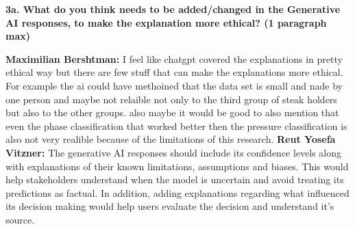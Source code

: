 \documentclass[10pt,twocolumn]{article}
\begin{document}
\smallskip
\noindent\textbf{3a. What do you think needs to be added/changed in the Generative AI responses, to make the explanation more ethical? (1 paragraph max)}

\noindent\textbf{Maximilian Bershtman:} I feel like chatgpt covered the explanations in pretty ethical way but there are few stuff that can make the explanations more ethical. For example the ai could have methoined that the data set is small and nade by one person and maybe not relaible not only to the third group of steak holders but also to the other groups. also maybe it would be good to also mention that even the phase classification that worked better then the pressure classification is also not very realible because of the limitations of this research. \textbf{Reut Yosefa Vitzner:} The generative AI responses should include its confidence levels along with explanations of their known limitations, assumptions and biases. This would help stakeholders understand when the model is uncertain and avoid treating its predictions as factual. In addition, adding explanations regarding what influenced its decision making would help users evaluate the decision and understand it's source.

\small


\end{document}
